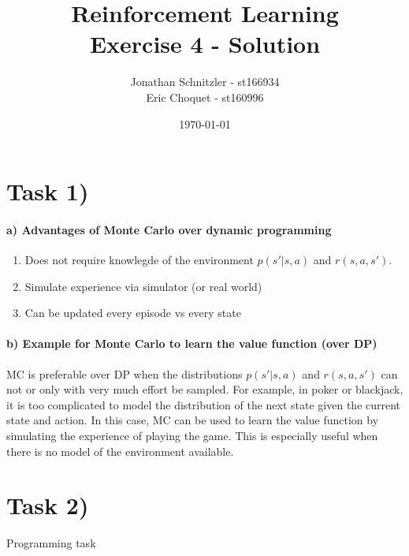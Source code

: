 \documentclass{article}
\title{Reinforcement Learning \\ Exercise 4 - Solution}
\author{Jonathan Schnitzler - st166934 \\
Eric Choquet - st160996}
\date{\today}
\begin{document}
\maketitle
\section*{Task 1)}


\paragraph*{a) Advantages of Monte Carlo over dynamic programming}

\begin{enumerate}
    \item Does not require knowlegde of the environment $p(s'| s,a)$ and $r(s,a,s')$.
    \item Simulate experience via simulator (or real world)
    \item Can be updated every episode vs every state
\end{enumerate}

\paragraph*{b) Example for Monte Carlo to learn the value function (over DP)}

MC is preferable over DP when the distributions $p(s'|s, a)$ and $r(s,a,s')$ can not or only with very much effort be sampled. For example, in poker or blackjack, it is too complicated to model the distribution of the next state given the current state and action. In this case, MC can be used to learn the value function by simulating the experience of playing the game. This is especially useful when there is no model of the environment available.



\section*{Task 2)}

Programming task
\end{document}
